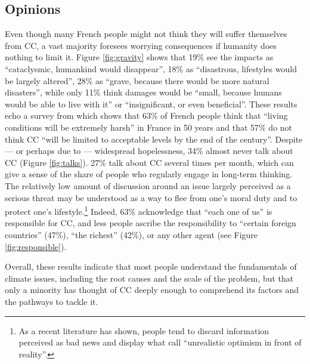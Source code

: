 \documentclass[english,5p,authoryear]{elsarticle}
\begin{document}
    \subsection{Opinions\label{subsec:opinions}}
Even though many French people might not think they will suffer themselves from CC, a vast majority foresees worrying consequences if humanity does nothing to limit it. Figure \ref{fig:gravity} shows that 19\% see the impacts as ``cataclysmic, humankind would disappear'', 18\% as ``disastrous, lifestyles would be largely altered'', 28\% as ``grave, because there would be more natural disasters'', while only 11\% think damages would be ``small, because humans would be able to live with it'' or ``insignificant, or even beneficial''. These results echo a survey from \citet{ademe_representations_2018} which shows that 63\% of French people think that ``living conditions will be extremely harsh'' in France in 50 years and that 57\% do not think CC ``will be limited to acceptable levels by the end of the century''. Despite --- or perhaps due to --- widespread hopelessness, 34\% almost never talk about CC (Figure \ref{fig:talks}). 27\% talk about CC several times per month, which can give a sense of the share of people who regularly engage in long-term thinking. The relatively low amount of discussion around an issue largely perceived as a serious threat may be understood as a way to flee from one's moral duty and to protect one's lifestyle.\footnote{As a recent literature has shown, people tend to discard information perceived as bad news and display what \citet{sharot_et_al_2011} call ``unrealistic optimism in front of reality''.} Indeed, 63\% acknowledge that ``each one of us'' is responsible for CC, and less people ascribe the responsibility to ``certain foreign countries'' (47\%), ``the richest'' (42\%), or any other agent (see Figure \ref{fig:responsible}).



Overall, these results indicate that most people understand the fundamentals of climate issues, including the root causes and the scale of the problem, but that only a minority has thought of CC deeply enough to comprehend its factors and the pathways to tackle it.
\end{document}
